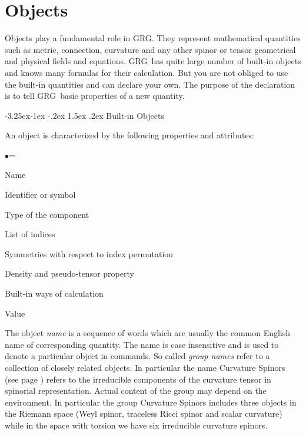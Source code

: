 \documentclass[twoside,openright]{report}
\makeatletter
\newcommand{\grgtt}{\ttfamily}
\renewcommand{\tt}{\grgtt}
\newcommand{\grg}{{\sc GRG}}
\renewcommand\subsection{\@startsection{subsection}{2}{\z@}%
                                     {-3.25ex\@plus -1ex \@minus -.2ex}%
                                     {1.5ex \@plus .2ex}%
                                     {\normalfont\large\slshape\bfseries}}
\makeatother
\begin{document}
\section{Objects}

Objects play a fundamental role in \grg. They represent
mathematical quantities such as metric, connection, curvature
and any other spinor or tensor geometrical and physical fields
and equations. \grg\ has quite large number of built-in
objects and knows many formulas for their calculation.
But you are not obliged to use the built-in quantities
and can declare your own. The purpose of the declaration is
to tell \grg\ basic properties of a new quantity.


\subsection{Built-in Objects}

\noindent
An object is characterized by the following properties and attributes:
\begin{list}{$\bullet$}{\leftmargin=\parindent\parsep=0mm}
\item Name
\item Identifier or symbol
\item Type of the component
\item List of indices
\item Symmetries with respect to index permutation
\item Density and pseudo-tensor property
\item Built-in ways of calculation
\item Value
\end{list}

The object \emph{name} is a sequence of words which are
usually the common English name of corresponding quantity.
The name is case insensitive and is used to denote
a particular object in commands.
So called \emph{group names}
refer to a collection of closely related objects. In particular
the name {\tt Curvature Spinors} (see page \pageref{curspincoll})
refers to the irreducible components of the curvature tensor in
spinorial representation.
Actual content of the group may depend on the environment.
In particular the group {\tt Curvature Spinors} includes
three objects in the Riemann space (Weyl spinor, traceless
Ricci spinor and scalar curvature) while in the space with
torsion we have six irreducible curvature spinors.
\end{document}
